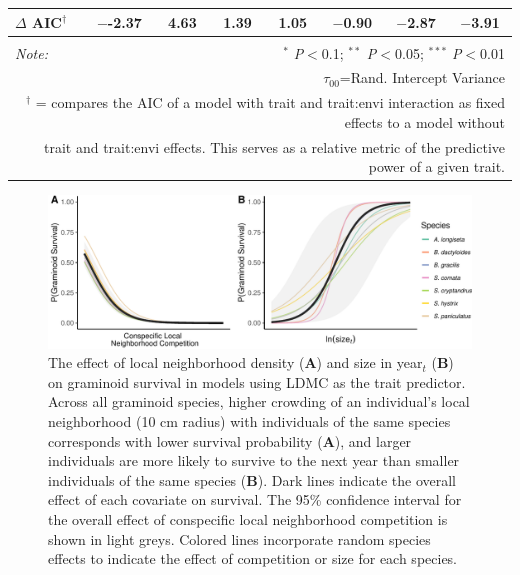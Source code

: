 \documentclass[12pt, letterpaper]{article}
\begin{document}
\begin{table}[h]
{\begin{tabular}{lccccccc}
\hline 
\rowcolor[gray]{.95}$\Delta$ AIC$^\dagger$ & $-$-2.37 & 4.63 & 1.39 & 1.05 & $-$0.90 & $-$2.87 & $-$3.91 \\
\hline 
\hline \\[-1.8ex] 
\textit{Note:} & \multicolumn{7}{r}{$^{*}$ \textit{P}$<$0.1; $^{**}$ \textit{P}$<$0.05; $^{***}$ \textit{P}$<$0.01} \\ 
\multicolumn{8}{r}{$\tau_{00}$=Rand. Intercept Variance}\\ 
\multicolumn{8}{r}{$^\dagger$ = compares the AIC of a model with trait and trait:envi interaction as fixed effects to a model without}\\
\multicolumn{8}{r}{trait and trait:envi effects. This serves as a relative metric of the predictive power of a given trait.}
\end{tabular} }
\end{table} 

\begin{figure}[h]
  \centering
  \includegraphics[width=.8\textwidth]{survEffectPlots-1.pdf}
  \caption{\internallinenumbers The effect of local neighborhood density (\textbf{A}) and size in year$_\textit{t}$ (\textbf{B}) on graminoid survival in models using LDMC as the trait predictor. Across all graminoid species, higher crowding of an individual’s local neighborhood (10 cm radius) with individuals of the same species corresponds with lower survival probability (\textbf{A}), and larger individuals are more likely to survive to the next year than smaller individuals of the same species (\textbf{B}). Dark lines indicate the overall effect of each covariate on survival. The 95\% confidence interval for the overall effect of conspecific local neighborhood competition is shown in light greys. Colored lines incorporate random species effects to indicate the effect of competition or size for each species.}
  \label{fig:Effects_Survival}
\end{figure}
\end{document}
